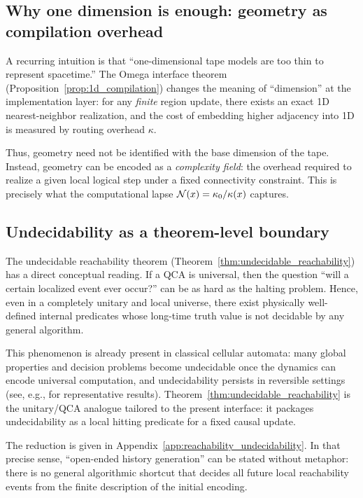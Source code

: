 \subsection{Why one dimension is enough: geometry as compilation overhead}
A recurring intuition is that ``one-dimensional tape models are too thin to represent spacetime.''
The Omega interface theorem (Proposition~\ref{prop:1d_compilation}) changes the meaning of ``dimension'' at the implementation layer:
for any \emph{finite} region update, there exists an exact 1D nearest-neighbor realization, and the cost of embedding higher adjacency into 1D is measured by routing overhead $\kappa$.

Thus, geometry need not be identified with the base dimension of the tape.
Instead, geometry can be encoded as a \emph{complexity field}: the overhead required to realize a given local logical step under a fixed connectivity constraint.
This is precisely what the computational lapse $\mathcal{N}(x)=\kappa_0/\kappa(x)$ captures.

\subsection{Undecidability as a theorem-level boundary}
The undecidable reachability theorem (Theorem~\ref{thm:undecidable_reachability}) has a direct conceptual reading.
If a QCA is universal, then the question ``will a certain localized event ever occur?'' can be as hard as the halting problem.
Hence, even in a completely unitary and local universe, there exist physically well-defined internal predicates whose long-time truth value is not decidable by any general algorithm.

\noindent This phenomenon is already present in classical cellular automata: many global properties and decision problems become undecidable once the dynamics can encode universal computation, and undecidability persists in reversible settings (see, e.g., \cite{Kari1990,Kari1994} for representative results).
Theorem~\ref{thm:undecidable_reachability} is the unitary/QCA analogue tailored to the present interface: it packages undecidability as a local hitting predicate for a fixed causal update.

The reduction is given in Appendix~\ref{app:reachability_undecidability}.
In that precise sense, ``open-ended history generation'' can be stated without metaphor: there is no general algorithmic shortcut that decides all future local reachability events from the finite description of the initial encoding.

